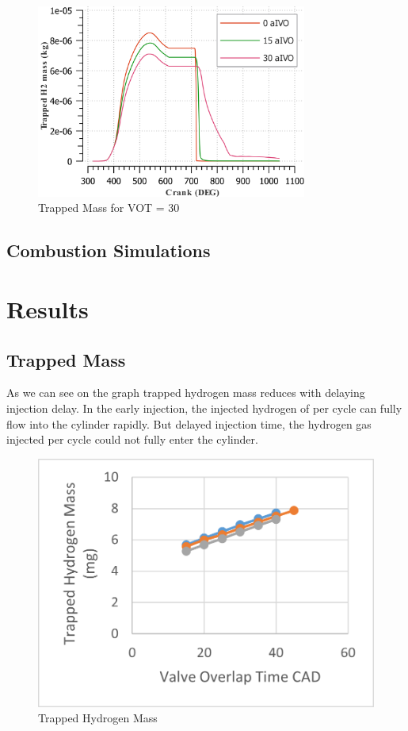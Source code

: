 \documentclass[conference]{IEEEtran}
\begin{document}
\begin{figure}[htbp]
    \centerline{\includegraphics[width=88.9mm]{Plots/30_h2.png}}
    \caption{Trapped Mass for VOT = 30}
    \label{plt_ttt}
    \end{figure}



\subsection{Combustion Simulations}

\section{Results}
\subsection{Trapped Mass}
As we can see on the graph trapped hydrogen mass reduces with delaying injection delay. In the early injection, the injected hydrogen of per cycle can fully flow into the cylinder rapidly. But delayed injection time, the hydrogen gas injected per cycle could not fully enter the cylinder. 

\begin{figure}[htbp]
    \centerline{\includegraphics{Plots/trapped mass.png}}
    \caption{Trapped Hydrogen Mass}
    \label{plt_1}
    \end{figure}
\end{document}
